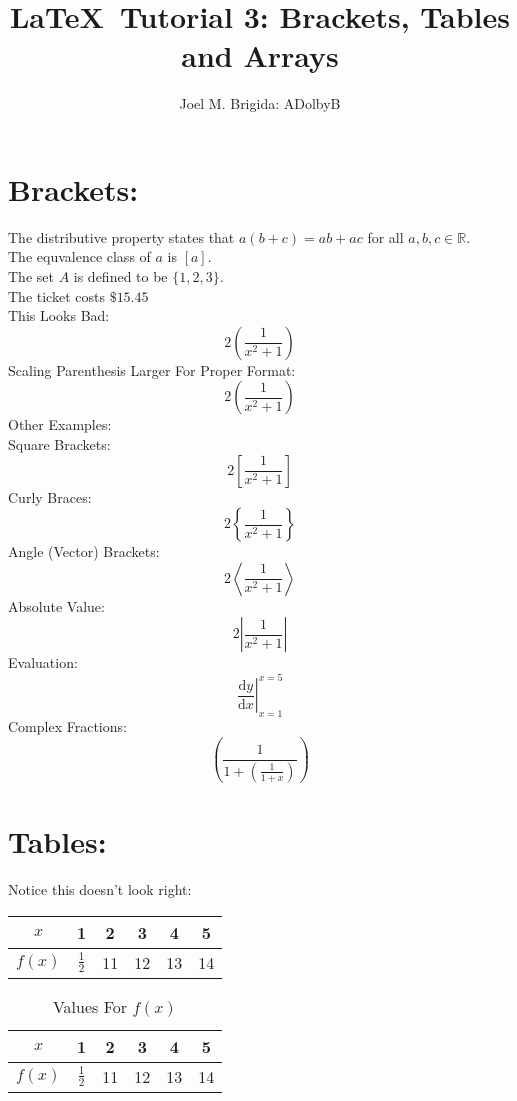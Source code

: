 \documentclass[11pt]{article} %
\title{\LaTeX\ Tutorial 3: Brackets, Tables and Arrays}
\author{Joel M. Brigida: ADolbyB}
\begin{document}
\maketitle %

\section{Brackets:}
\thispagestyle{empty} %

The distributive property states that $a(b+c) = ab + ac$ for all $a, b, c \in \mathbb{R}$.\\[6pt]
The equvalence class of $a$ is $[a]$.\\[6pt]
The set $A$ is defined to be $\{1, 2, 3\}$.\\[6pt]
The ticket costs $\$15.45$\\[6pt]
This Looks Bad: $$ 2(\frac{1}{x^2 +1}) $$
Scaling Parenthesis Larger For Proper Format: $$ 2\left(\frac{1}{x^2+1}\right) $$
Other Examples:\\[6pt]
Square Brackets:
$$ 2\left[\frac{1}{x^2+1}\right] $$
Curly Braces:
$$ 2\left\{\frac{1}{x^2+1}\right\} $$
Angle (Vector) Brackets:
$$ 2\left\langle\frac{1}{x^2+1}\right\rangle $$
Absolute Value:
$$ 2\left|\frac{1}{x^2+1}\right| $$
Evaluation:
$$ \left.\frac{\mathrm{d}y}{\mathrm{d}x}\right|_{x=1}^{x=5} $$
Complex Fractions:
$$ \left(\frac{1}{1 + \left(\frac{1}{1+x}\right)}\right) $$

\pagebreak

\section{Tables:}
Notice this doesn't look right:\\[6pt]
\begin{tabular}{|c||c|c|c|c|c|} %
    \hline
    $x$ & 1 & 2 & 3 & 4 & 5 \\ \hline
    $f(x)$ & $\frac{1}{2}$ & 11 & 12 & 13 & 14 \\ \hline
\end{tabular}

\vspace{1cm} %

\begin{table}[h!] %
\centering
\def\arraystretch{1.4}
\caption{Values For $f(x)$}
\begin{tabular}{|c||c|c|c|c|c|}
    \hline
    $x$ & 1 & 2 & 3 & 4 & 5 \\ \hline
    $f(x)$ & $\frac{1}{2}$ & 11 & 12 & 13 & 14 \\ \hline
\end{tabular}
\end{table}
\end{document}

